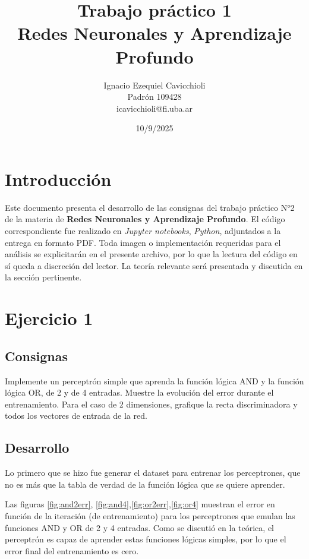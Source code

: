 \documentclass[11pt]{article} %
\title{Trabajo práctico 1\\ Redes Neuronales y Aprendizaje Profundo}
\author{Ignacio Ezequiel Cavicchioli\\Padrón 109428\\icavicchioli@fi.uba.ar}
\date{10/9/2025} %
\begin{document}
\maketitle

\tableofcontents



\section{Introducción}

Este documento presenta el desarrollo de las consignas del trabajo práctico N°2 de la materia de \textbf{Redes Neuronales y Aprendizaje Profundo}.  El código correspondiente fue realizado en  \textit{Jupyter notebooks}, \textit{Python}, adjuntados a la entrega en formato PDF. Toda imagen o implementación requeridas para el análisis se explicitarán en el presente archivo, por lo que la lectura del código en sí queda a discreción del lector. La teoría relevante será presentada y discutida en la sección pertinente.


\newpage

\section{Ejercicio 1}

\subsection{Consignas}

Implemente un perceptrón simple que aprenda la función lógica AND y la función lógica OR, de 2 y de 4 entradas. Muestre la evolución del error durante el entrenamiento. Para el caso de 2 dimensiones, grafique la recta discriminadora y todos los vectores de entrada de la red.

\subsection{Desarrollo}

Lo primero que se hizo fue generar el dataset para entrenar los perceptrones, que no es más que la tabla de verdad de la función lógica que se quiere aprender.

Las figuras \ref{fig:and2err}, \ref{fig:and4},\ref{fig:or2err},\ref{fig:or4} muestran el error en función de la iteración (de entrenamiento) para los perceptrones que emulan las funciones AND y OR de 2 y 4 entradas. Como se discutió en la teórica, el perceptrón es capaz de aprender estas funciones lógicas simples, por lo que el error final del entrenamiento es cero.
\end{document}
